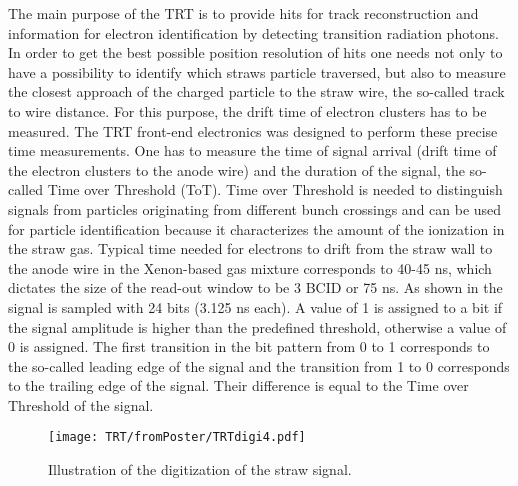 The main purpose of the TRT is to provide hits for track reconstruction and information for electron identification by detecting transition radiation photons.
In order to get the best possible position resolution of hits one needs not only to have a possibility to identify which straws particle traversed,
but also to measure the closest approach of the charged particle to the straw wire, the so-called track to wire distance. 
For this purpose, the drift time of electron clusters has to be measured.
The TRT front-end electronics was designed to perform these precise time measurements.
One has to measure the time of signal arrival (drift time of the electron clusters to the anode wire) and the duration of the signal, the so-called Time over Threshold (ToT).
Time over Threshold is needed to distinguish signals from particles originating from different bunch crossings 
and can be used for particle identification because it characterizes the amount of the ionization in the straw gas.
Typical time needed for electrons to drift from the straw wall to the anode wire in the Xenon-based gas mixture corresponds to 40-45 ns, which dictates the size of the read-out window to be 
3 BCID or 75 ns. As shown in  the signal is sampled with 24 bits (3.125 ns each). 
A value of 1 is assigned to a bit if the signal amplitude is higher than the predefined threshold, 
otherwise a value of 0 is assigned. The first transition in the bit pattern from 0 to 1 corresponds to the so-called leading edge of the signal and the transition from 1 to 0 
corresponds to the trailing edge of the signal. Their difference is equal to the Time over Threshold of the signal. 

\begin{figure}
\begin{center}
 \texttt{[image: TRT/fromPoster/TRTdigi4.pdf]}
\caption{Illustration of the digitization of the straw signal.}
\label{fig:pulseDigitization}
\end{center}
\end{figure}


